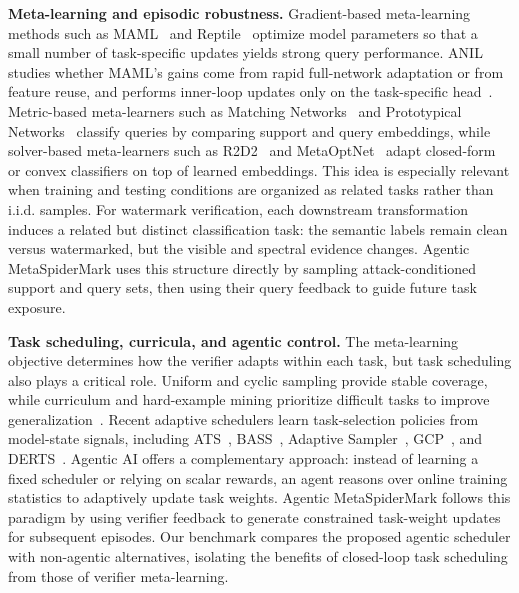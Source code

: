 {\bf Meta-learning and episodic robustness.}
Gradient-based meta-learning methods such as MAML~\cite{finn2017maml} and Reptile~\cite{nichol2018reptile} optimize model parameters so that a small number of task-specific updates yields strong query performance.
ANIL studies whether MAML's gains come from rapid full-network adaptation or from feature reuse, and performs inner-loop updates only on the task-specific head~\cite{raghu2020rapid}.
Metric-based meta-learners such as Matching Networks~\cite{vinyals2016matching} and Prototypical Networks~\cite{snell2017prototypical} classify queries by comparing support and query embeddings, while solver-based meta-learners such as R2D2~\cite{bertinetto2019meta} and MetaOptNet~\cite{lee2019metaoptnet} adapt closed-form or convex classifiers on top of learned embeddings.
This idea is especially relevant when training and testing conditions are organized as related tasks rather than i.i.d. samples.
For watermark verification, each downstream transformation induces a related but distinct classification task: the semantic labels remain clean versus watermarked, but the visible and spectral evidence changes.
Agentic MetaSpiderMark uses this structure directly by sampling attack-conditioned support and query sets, then using their query feedback to guide future task exposure.


{\bf Task scheduling, curricula, and agentic control.}
The meta-learning objective determines how the verifier adapts within each task, but task scheduling also plays a critical role. Uniform and cyclic sampling provide stable coverage, while curriculum and hard-example mining prioritize difficult tasks to improve generalization~\cite{bengio2009curriculum}. Recent adaptive schedulers learn task-selection policies from model-state signals, including ATS~\cite{yao2021ats}, BASS~\cite{ban2023bass}, Adaptive Sampler~\cite{wang2024tasksampler}, GCP~\cite{liu2020adaptive}, and DERTS~\cite{zhan2024derts}. Agentic AI offers a complementary approach: instead of learning a fixed scheduler or relying on scalar rewards, an agent reasons over online training statistics to adaptively update task weights. Agentic MetaSpiderMark follows this paradigm by using verifier feedback to generate constrained task-weight updates for subsequent episodes. Our benchmark compares the proposed agentic scheduler with non-agentic alternatives, isolating the benefits of closed-loop task scheduling from those of verifier meta-learning.

